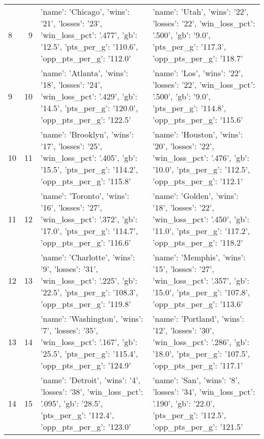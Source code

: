 \begin{tabular}{lrll}
8 & 9 & {'name': 'Chicago', 'wins': '21', 'losses': '23', 'win_loss_pct': '.477', 'gb': '12.5', 'pts_per_g': '110.6', 'opp_pts_per_g': '112.0'} & {'name': 'Utah', 'wins': '22', 'losses': '22', 'win_loss_pct': '.500', 'gb': '9.0', 'pts_per_g': '117.3', 'opp_pts_per_g': '118.7'} \\
9 & 10 & {'name': 'Atlanta', 'wins': '18', 'losses': '24', 'win_loss_pct': '.429', 'gb': '14.5', 'pts_per_g': '120.0', 'opp_pts_per_g': '122.5'} & {'name': 'Los', 'wins': '22', 'losses': '22', 'win_loss_pct': '.500', 'gb': '9.0', 'pts_per_g': '114.8', 'opp_pts_per_g': '115.6'} \\
10 & 11 & {'name': 'Brooklyn', 'wins': '17', 'losses': '25', 'win_loss_pct': '.405', 'gb': '15.5', 'pts_per_g': '114.2', 'opp_pts_per_g': '115.8'} & {'name': 'Houston', 'wins': '20', 'losses': '22', 'win_loss_pct': '.476', 'gb': '10.0', 'pts_per_g': '112.5', 'opp_pts_per_g': '112.1'} \\
11 & 12 & {'name': 'Toronto', 'wins': '16', 'losses': '27', 'win_loss_pct': '.372', 'gb': '17.0', 'pts_per_g': '114.7', 'opp_pts_per_g': '116.6'} & {'name': 'Golden', 'wins': '18', 'losses': '22', 'win_loss_pct': '.450', 'gb': '11.0', 'pts_per_g': '117.2', 'opp_pts_per_g': '118.2'} \\
12 & 13 & {'name': 'Charlotte', 'wins': '9', 'losses': '31', 'win_loss_pct': '.225', 'gb': '22.5', 'pts_per_g': '108.3', 'opp_pts_per_g': '119.8'} & {'name': 'Memphis', 'wins': '15', 'losses': '27', 'win_loss_pct': '.357', 'gb': '15.0', 'pts_per_g': '107.8', 'opp_pts_per_g': '113.6'} \\
13 & 14 & {'name': 'Washington', 'wins': '7', 'losses': '35', 'win_loss_pct': '.167', 'gb': '25.5', 'pts_per_g': '115.4', 'opp_pts_per_g': '124.9'} & {'name': 'Portland', 'wins': '12', 'losses': '30', 'win_loss_pct': '.286', 'gb': '18.0', 'pts_per_g': '107.5', 'opp_pts_per_g': '117.1'} \\
14 & 15 & {'name': 'Detroit', 'wins': '4', 'losses': '38', 'win_loss_pct': '.095', 'gb': '28.5', 'pts_per_g': '112.4', 'opp_pts_per_g': '123.0'} & {'name': 'San', 'wins': '8', 'losses': '34', 'win_loss_pct': '.190', 'gb': '22.0', 'pts_per_g': '112.5', 'opp_pts_per_g': '121.5'} \\
\end{tabular}


